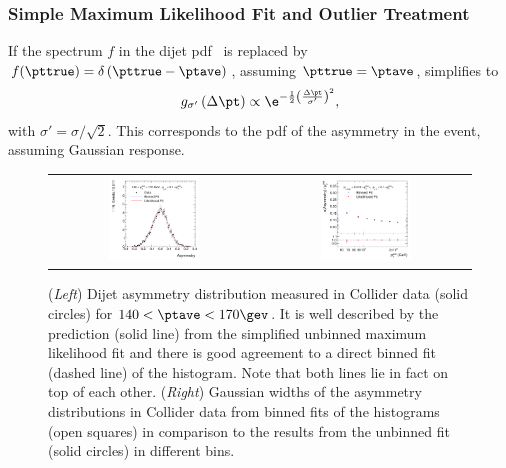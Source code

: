 \subsubsection{Simple Maximum Likelihood Fit and Outlier Treatment}\label{sec:ResFit:DataDriven:SimpleFit}

If the spectrum $f$ in the dijet pdf~ is replaced by \mbox{$f(\pttrue)  = \delta\left(\pttrue - \ptave\right)$}, \ie assuming \mbox{$\pttrue = \ptave$}, 
 simplifies to
\begin{equation}
\label{eq:ResFit::DijetPdfTransformed:Simple}
  g_{\sigma'}\left(\Delta\pt\right) \propto
  \e^{-\frac{1}{2}\left(\frac{\Delta\pt}{\sigma'}\right)^{2}}, 
\end{equation}
with \mbox{$\sigma' = \sigma/\sqrt{2}$}.
This corresponds to the pdf of the asymmetry in the event, assuming
Gaussian response.

\begin{figure}[ht]
 \centering
  \begin{tabular}{cc}
    \includegraphics[width=0.45\textwidth]{figures/MaxLikeSimple_Data132440-144011_Eta00-13_PtAsymmetry_PtBin4_Pt3Cut3} &
    \includegraphics[width=0.45\textwidth]{figures/MaxLikeSimple_Data132440-144011_Eta00-13_PtAsymmetryWidthBottomRatio_Pt3Cut3} \\
\end{tabular}
 \caption{(\textit{Left}) Dijet asymmetry distribution measured in
    Collider data (solid circles) for \mbox{$140 < \ptave < 170\gev$}.
    It is well described by the prediction (solid line) from the
    simplified unbinned maximum likelihood fit and there is good agreement to a direct binned
    fit (dashed line) of the histogram.
    Note that both lines lie in fact on top of each other.
    (\textit{Right}) Gaussian widths of the asymmetry distributions in
    Collider data from binned fits of the
    histograms (open squares) in comparison to the results from
    the unbinned fit (solid circles) in different \ptave bins.}
  \label{fig:ResFit:DataDriven:Simple}
\end{figure}

